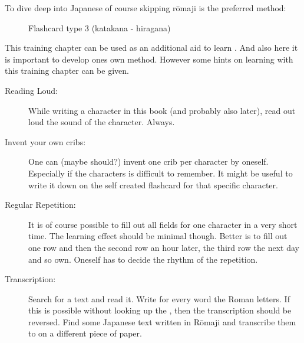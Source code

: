 \normalsize

To dive deep into Japanese of course skipping rōmaji is the preferred method:

\begin{figure}[H]
        
        \caption{Flashcard type 3 (katakana - hiragana)}
        \label{fig:FlashCardTypeThree}
\end{figure}

This training chapter can be used as an additional aid to learn
\textbf{\jtopic}. And also here it is important to develop ones own method.
However some hints on learning with this training chapter can be given.

\begin{description}

\item[Reading Loud:] While writing a \textbf{\jtopic} character in this book
        (and probably also later), read out loud the sound of the character.
        Always.

\item[Invent your own cribs:] One can (maybe should?) invent one crib per
        character by oneself. Especially if the characters is difficult to
        remember. It might be useful to write it down on the self created
        flashcard for that specific character.

\item[Regular Repetition:] It is of course possible to fill out all fields for
        one character in a very short time. The learning effect should be
        minimal though. Better is to fill out one row and then the second row
        an hour later, the third row the next day and so own. Oneself has to
        decide the rhythm of the repetition.

\item[Transcription:]  Search for a  \textbf{\jtopic} text and read it. Write
        for every \textbf{\jtopic} word the Roman letters. If this is possible
        without looking up the \textbf{\jtopic}, then the transcription should
        be reversed. Find some Japanese text written in Rōmaji and transcribe
        them to \textbf{\jtopic} on a different piece of paper.

\end{description}

\newpage


